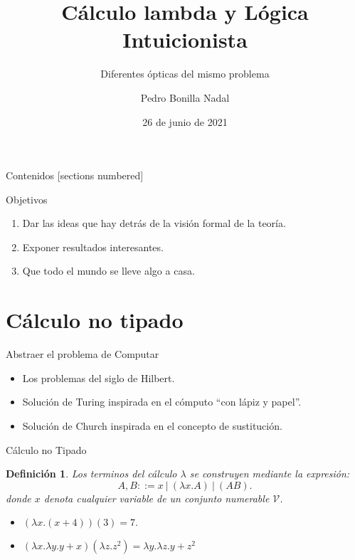 \documentclass[usenames,dvipsnames]{beamer}
\title{Cálculo lambda y Lógica Intuicionista}
\subtitle{Diferentes ópticas del mismo problema}
\date{26 de junio de 2021}
\institute{EsLibre 2021}
\author{Pedro Bonilla Nadal}
\newtheorem{definicion}{Definición}
\begin{document}
\maketitle
\begin{frame}{Contenidos}
  [sections numbered]
  \tableofcontents [hideallsubsections]
\end{frame}
\begin{frame}{Objetivos}
  \begin{enumerate}
  \item Dar las ideas que hay detrás de la visión formal de la teoría.
  \item Exponer resultados interesantes.
  \item Que todo el mundo se lleve algo a casa.
  \end{enumerate}
\end{frame}
\section{Cálculo no tipado}
\begin{frame}{Abstraer el problema de Computar}
  \begin{itemize}
  \item Los problemas del siglo de Hilbert.
  \item Solución de Turing inspirada en el cómputo ``con lápiz y papel''.
  \item Solución de Church inspirada en el concepto de sustitución.
  \end{itemize}
\end{frame}

\begin{frame}{Cálculo no Tipado}
  \begin{definicion}
    Los terminos del cálculo $\lambda$ se construyen mediante la expresión:
    $$A,B ::= x\ |\ (\lambda x.A)\ |\ (AB) .$$
    donde $x$ denota cualquier variable de un conjunto numerable $\mathcal{V}$.
  \end{definicion}
  \pause
  \begin{example}
    \begin{itemize}
    \item $(\lambda x.(x+4)) (3) = 7.$
    \item $(\lambda x.\lambda y. y+x)(\lambda z. z^2) = \lambda y. \lambda z. y+z^2 $
    \end{itemize}
  \end{example}
\end{frame}
\end{document}
